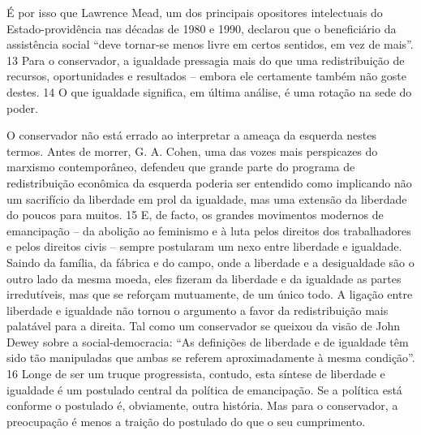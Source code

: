 \par
 
É por isso que Lawrence Mead, um dos principais opositores intelectuais do Estado-providência nas décadas de 1980 e 1990, declarou que o beneficiário da assistência social “deve tornar-se menos livre em certos sentidos, em vez de mais”.
 {\color{blue} 13}  
Para o conservador, a igualdade pressagia mais do que uma redistribuição de recursos, oportunidades e resultados – embora ele certamente também não goste destes.
 {\color{blue} 14}  
O que igualdade significa, em última análise, é uma rotação na sede do poder.
 
\par
 
O conservador não está errado ao interpretar a ameaça da esquerda nestes termos. Antes de morrer, G. A. Cohen, uma das vozes mais perspicazes do marxismo contemporâneo, defendeu que grande parte do programa de redistribuição econômica da esquerda poderia ser entendido como implicando não um sacrifício da liberdade em prol da igualdade, mas uma extensão da liberdade do poucos para muitos.
 {\color{blue} 15}  
E, de facto, os grandes movimentos modernos de emancipação – da abolição ao feminismo e à luta pelos direitos dos trabalhadores e pelos direitos civis – sempre postularam um nexo entre liberdade e igualdade. Saindo da família, da fábrica e do campo, onde a liberdade e a desigualdade são o outro lado da mesma moeda, eles fizeram da liberdade e da igualdade as partes irredutíveis, mas que se reforçam mutuamente, de um único todo. A ligação entre liberdade e igualdade não tornou o argumento a favor da redistribuição mais palatável para a direita. Tal como um conservador se queixou da visão de John Dewey sobre a social-democracia: “As definições de liberdade e de igualdade têm sido tão manipuladas que ambas se referem aproximadamente à mesma condição”.
 {\color{blue} 16}  
Longe de ser um truque progressista, contudo, esta síntese de liberdade e igualdade é um postulado central da política de emancipação. Se a política está conforme o postulado é, obviamente, outra história. Mas para o conservador, a preocupação é menos a traição do postulado do que o seu cumprimento.
 
\par
 
